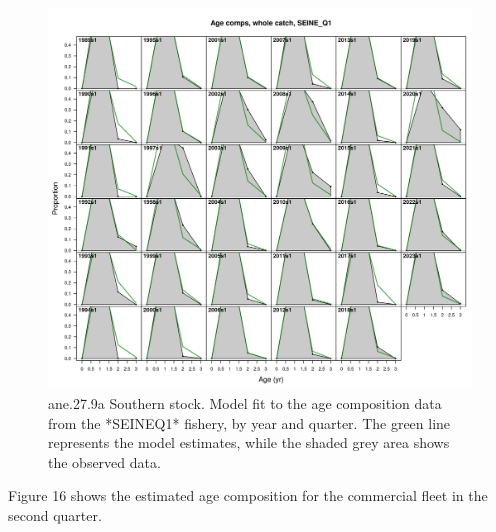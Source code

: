 \documentclass[
]{article}
\begin{document}
\begin{figure}[H]

{\centering \includegraphics[width=0.95\linewidth]{report/run/S1.0_4FLEETS_SelECO_RecIndex_Mnewfix/fig_age_fit_SeineQ1} 

}

\caption{ane.27.9a Southern stock. Model fit to the age composition data from the *SEINEQ1* fishery, by year and quarter. The green line represents the model estimates, while the shaded grey area shows the observed data.}\label{fig:unnamed-chunk-45}
\end{figure}

Figure 16 shows the estimated age composition for the commercial fleet
in the second quarter.
\end{document}
